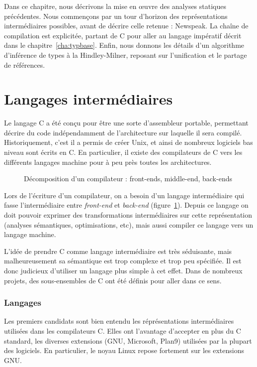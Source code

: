 Dans ce chapitre, nous décrivons la mise en œuvre des analyses statiques
précédentes. Nous commençons par un tour d'horizon des représentations
intermédiaires possibles, avant de décrire celle retenue : Newspeak. La chaîne
de compilation est explicitée, partant de C pour aller au langage impératif
décrit dans le chapitre~\ref{cha:typbase}. Enfin, nous donnons les détails d'un
algorithme d'inférence de types à la Hindley-Milner, reposant sur l'unification
et le partage de références.

\section{Langages intermédiaires}

Le langage C \cite{KandR,AnsiC} a été conçu pour être une sorte d'assembleur
portable, permettant décrire du code indépendamment de l'architecture sur
laquelle il sera compilé. Historiquement, c'est il a permis de créer Unix, et
ainsi de nombreux logiciels bas niveau sont écrits en C. En particulier, il
existe des compilateurs de C vers les différents langages machine pour à peu
près toutes les architectures.

\begin{figure}
  \centering

  

  \caption{Décomposition d'un compilateur : front-ends, middle-end, back-ends}
  \label{fig:middle-end}
\end{figure}

Lors de l'écriture d'un compilateur, on a besoin d'un langage intermédiaire qui
fasse l'intermédiaire entre \emph{front-end} et \emph{back-end}
(figure~\ref{fig:middle-end}). Depuis ce langage on doit pouvoir exprimer des
transformations intermédiaires sur cette représentation (analyses sémantiques,
optimisations, etc), mais aussi compiler ce langage vers un langage machine.

L'idée de prendre C comme langage intermédiaire est très séduisante, mais
malheureusement sa sémantique est trop complexe et trop peu spécifiée. Il est
donc judicieux d'utiliser un langage plus simple à cet effet. Dans de nombreux
projets, des sous-ensembles de C ont été définis pour aller dans ce sens.

\subsubsection{Langages}

Les premiers candidats sont bien entendu les réprésentations intermédiaires
utilisées dans les compilateurs C. Elles ont l'avantage d'accepter en plus du C
standard, les diverses extensions (GNU, Microsoft, Plan9) utilisées par la
plupart des logiciels. En particulier, le noyau Linux repose fortement sur les
extensions GNU.

